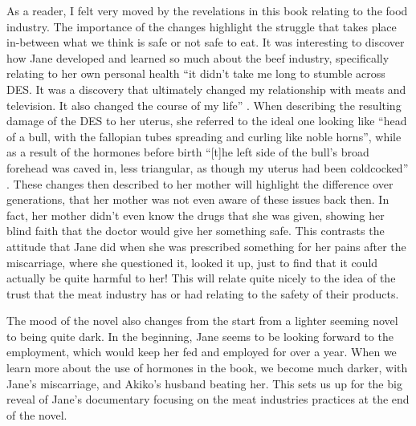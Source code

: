 \documentclass{article}
\begin{document}
As a reader, I felt very moved by the revelations in this book relating to
the food industry.
The importance of the changes highlight the struggle that takes
place in-between what we think is safe or not safe to eat. It was
interesting to discover how Jane developed and learned so much about the
beef industry, specifically relating to her own personal health ``it
didn't take me long to stumble across DES. It was a discovery that
ultimately changed my relationship with meats and television. It also
changed the course of my life'' \cite{ozeki1998my}. When describing the
resulting damage of the DES to her uterus, she referred to the ideal one
looking like ``head of a bull, with the fallopian tubes spreading and
curling like noble horns'', while as a result of the hormones before birth
``[t]he left side of the bull’s broad forehead was caved in, less
triangular, as though my uterus had been coldcocked'' \cite{ozeki1998my}.
These changes then described to her mother will highlight the difference
over generations, that her mother was not even aware of these issues back
then. In fact, her mother didn't even know the drugs that she was given,
showing her blind faith that the doctor would give her something safe. This
contrasts the attitude that Jane did when she was prescribed something for
her pains after the miscarriage, where she questioned it, looked it up, just
to find that it could actually be quite harmful to her! This will relate
quite nicely to the idea of the trust that the meat industry has or had
relating to the safety of their products.

The mood of the novel also changes from the start from a lighter seeming
novel to being quite dark. In the beginning, Jane seems to be looking
forward to the employment, which would keep her fed and employed for over a
year. When we learn more about the use of hormones in the book, we become
much darker, with Jane's miscarriage, and Akiko's husband beating her. This
sets us up for the big reveal of Jane's documentary focusing on the meat
industries practices at the end of the novel.
\end{document}

